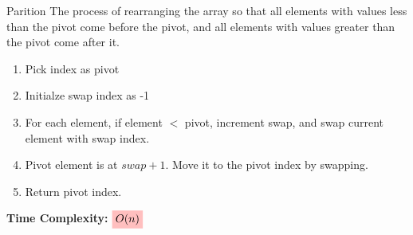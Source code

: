 \begin{theorem}
    {Parition}
    The process of rearranging the array so that all elements with values less than the pivot come before the pivot, and all elements with values greater than the pivot come after it.

    \begin{enumerate}
        \item Pick index as pivot
        \item Initialze swap index as -1
        \item For each element, if element $<$ pivot, increment swap, and swap current element with swap index.
        \item Pivot element is at $swap + 1$. Move it to the pivot index by swapping.
        \item Return pivot index.
    \end{enumerate}

    \textbf{Time Complexity:} $\mathcolorbox{pink}{O(n)}$
\end{theorem}

